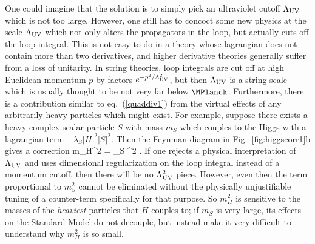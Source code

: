 One could imagine that the solution is to simply pick an ultraviolet
cutoff $\Lambda_{\rm UV}$ which is not too large. However,
one still has to concoct some new physics at the scale $\Lambda_{\rm UV}$
which not only alters the
propagators in the loop, but actually
cuts off the loop integral.
This is not easy to do in a theory whose lagrangian does
not contain more than two
derivatives, and higher derivative theories
generally suffer from a loss of unitarity.
In string theories, loop integrals are cut off at
high Euclidean momentum $p$ by factors $e^{-p^2/\Lambda^2_{\rm UV}}$, but
then $\Lambda_{\rm UV}$ is a string scale which
is usually thought to be not very far below $\MPlanck$.
Furthermore, there is a contribution similar to eq.~(\ref{quaddiv1}) from
the virtual effects of any
arbitrarily heavy particles which might exist.
For example, suppose there exists a
heavy complex scalar particle $S$ with mass $m_S$
which couples to the Higgs with a lagrangian term
$
-\lambda_S |H|^2 |S|^2$. Then the Feynman diagram
in Fig.~\ref{fig:higgscorr1}b  gives a correction
\beq
\Delta m_H^2 = {\lambda_S \pi^2}
.
\label{quaddiv2}
\eeq
If one rejects a physical interpretation of $\Lambda_{\rm UV}$
and uses dimensional regularization
on the loop integral instead of
a momentum cutoff, then there will be no $\Lambda_{\rm UV}^2$ piece.
However, even then the term proportional to $m_S^2$ cannot be eliminated
without the physically unjustifiable tuning of a counter-term specifically
for that purpose. So $m_H^2$ is sensitive to the
masses of the {\it heaviest} particles that $H$ couples to;
if $m_S$ is very large, its effects on the Standard Model
do not decouple, but instead make it very difficult to understand
why $m_H^2$ is so small.

